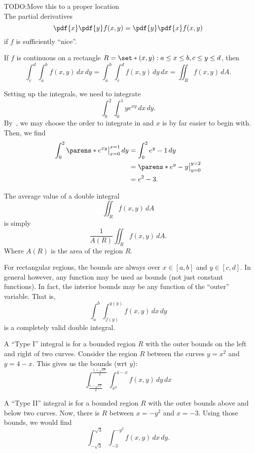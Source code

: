 \documentclass{article}
\begin{document}
\begin{thm}\label{thm:clairaut}
  TODO:\@ Move this to a proper location\\
  The partial derivatives
  \[ \pdf{x}\pdf{y} f(x, y) = \pdf{y}\pdf{x} f(x, y) \]
  if $f$ is sufficiently ``nice''.
\end{thm}
\begin{thm}\label{thm:fubini}
  If $f$ is continuous on a rectangle $R = \set*{ (x, y) : a \le x \le b, c \le y \le d }$, then
  \[
    \int_{c}^{d}\int_{a}^{b} f(x, y)\,dx\,dy
    =
    \int_{a}^{b}\int_{c}^{d} f(x, y)\,dy\,dx
    = \iint_{R} f(x, y) \, dA.
  \]
\end{thm}

\begin{ex}[Find the volume of the solid that is bounded by the coordinate planes, $x = 1$, $y = 1$ and $z = ye^{xy}$.]
  Setting up the integrals, we need to integrate
  \[
    \int_{0}^{2}\int_{0}^{1} ye^{xy}\,dx\,dy.
  \]
  By~, we may choose the order to integrate in and $x$ is by far easier to begin with.
  Then, we find
  \begin{align*}
    \int_{0}^{2}\parens*{e^{xy}}\big|_{x = 0}^{x = 1}\,dy
    &= \int_{0}^{2}e^{y} - 1\,dy\\
    &= \parens*{e^{y} - y}\big|_{y = 0}^{y = 2}\\ &= e^{2} - 3.
  \end{align*}
\end{ex}

\begin{prop}
  The average value of a double integral
  \[ \iint_{R}f(x, y)\,dA \]
  is simply
  \[ \frac{1}{A(R)}\iint_{R} f(x, y)\, dA. \]
  Where $A(R)$ is the area of the region $R$.
\end{prop}

For rectangular regions, the bounds are always over $x \in [a, b]$ and $y \in [c, d]$.
In general however, any function may be used as bounds (not just constant functions).
In fact, the interior bounds may be any function of the ``outer'' variable. That is,
\[ \int_{a}^{b}\int_{f(y)}^{g(y)}f(x, y)\,dx\,dy \]
is a completely valid double integral.

\begin{ex}
  A ``Type I'' integral is for a bounded region $R$ with the outer bounds on the left and right of two curves.
  Consider the region $R$ between the curves $y = x^{2}$ and $y = 4 - x$. This gives us the bounds (wrt $y$):
  \[
    \int_{\frac{1 - \sqrt{17}}{2}}^{\frac{1 + \sqrt{17}}{2}}\!\int_{x^{2}}^{4 - x}f(x, y)\,dy\,dx
  \]
\end{ex}
\begin{ex}
  A ``Type II'' integral is for a bounded region $R$ with the outer bounds above and below two curves.
  Now, there is $R$ between $x = -y^{2}$ and $x = -3$. Using those bounds, we would find
  \[ \int_{-\sqrt{3}}^{\sqrt{3}}\int_{-3}^{-y^{2}}f(x, y)\,dx\,dy. \]
\end{ex}
\end{document}
